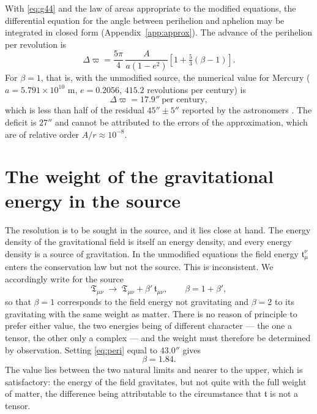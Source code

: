 \documentclass[aps,prd,reprint,amsmath,amssymb,nofootinbib,longbibliography]{revtex4-2}
\begin{document}
With \eqref{eq:g44} and the law of areas appropriate to the modified equations, the differential
equation for the angle between perihelion and aphelion may be integrated in closed form
(Appendix~\ref{app:approx}). The advance of the perihelion per revolution is
\begin{equation}
\Delta \varpi = \frac{5\pi}{4}\,\frac{A}{a(1-e^{2})}
   \left[ 1 + \tfrac{5}{3}(\beta - 1) \right] .
\label{eq:peri}
\end{equation}
For $\beta = 1$, that is, with the unmodified source, the numerical value for Mercury
($a = 5.791\times 10^{10}$ m, $e = 0.2056$, $415.2$ revolutions per century) is
\begin{equation}
\Delta\varpi = 17.9'' \ \text{per century} ,
\end{equation}
which is less than half of the residual $45'' \pm 5''$ reported by the astronomers
\cite{newcomb1895}. The deficit is $27''$ and cannot be attributed to the errors of the
approximation, which are of relative order $A/r \approx 10^{-8}$.

\section{The weight of the gravitational energy in the source}

The resolution is to be sought in the source, and it lies close at hand. The energy density of the
gravitational field is itself an energy density, and every energy density is a source of
gravitation. In the unmodified equations the field energy $\mathfrak{t}^{\nu}_{\mu}$ enters the
conservation law but not the source. This is inconsistent. We accordingly write for the source
\begin{equation}
\mathfrak{T}_{\mu\nu} \;\longrightarrow\; \mathfrak{T}_{\mu\nu}
   + \beta'\, \mathfrak{t}_{\mu\nu} , \qquad \beta = 1 + \beta' ,
\label{eq:beta}
\end{equation}
so that $\beta = 1$ corresponds to the field energy not gravitating and $\beta = 2$ to its
gravitating with the same weight as matter. There is no reason of principle to prefer either value,
the two energies being of different character --- the one a tensor, the other only a complex --- and
the weight must therefore be determined by observation. Setting \eqref{eq:peri} equal to $43.0''$
gives
\begin{equation}
\beta = 1.84 .
\label{eq:betaval}
\end{equation}
The value lies between the two natural limits and nearer to the upper, which is satisfactory: the
energy of the field gravitates, but not quite with the full weight of matter, the difference being
attributable to the circumstance that $\mathfrak{t}$ is not a tensor.
\end{document}
